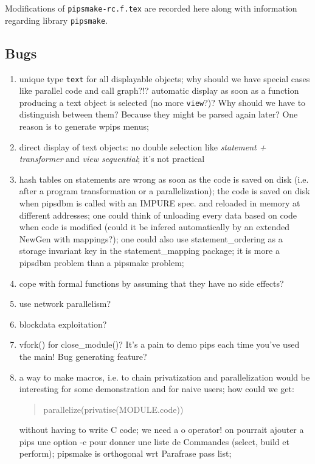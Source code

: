 Modifications of \verb+pipsmake-rc.f.tex+ are recorded here along with
information regarding library \verb+pipsmake+.

\subsection{Bugs}

\begin{enumerate}

  \item unique type {\tt text} for all displayable objects; why should
        we have special cases like parallel code and call graph?!?
        automatic display as soon as a function producing a text object
        is selected (no more {\tt view}?)? Why should we have to distinguish
        between them? Because they might be parsed again later? One
        reason is to generate wpips menus;

  \item direct display of text objects: no double selection like
        {\em statement + transformer} and {\em view sequential}; it's
        not practical

  \item hash tables on statements are wrong as soon as the code is saved
        on disk (i.e. after a program transformation or a
        parallelization); the code is saved on disk when pipsdbm is called
        with an IMPURE spec. and reloaded in memory at different addresses;
        one could think of unloading every data based on code when code
        is modified (could it be infered automatically by an extended
        NewGen with mappings?); one could also use statement\_ordering as
        a storage invariant key in the statement\_mapping package;
        it is more a pipsdbm problem than a pipsmake problem;

  \item cope with formal functions by assuming that they have no side
        effects?

  \item use network parallelism?

  \item blockdata exploitation?

  \item vfork() for close\_module()? It's a pain to demo pips each time
        you've used the main! Bug generating feature?

  \item a way to make macros, i.e. to chain privatization and
        parallelization would be interesting for some demonstration and
        for naive users; how could we get:
        \begin{quote}
                parallelize(privatise(MODULE.code))
        \end{quote}
        without having to write C code; we need a o operator! on
        pourrait ajouter a pips une option -c pour donner une liste de
        Commandes (select, build et perform); 
        pipsmake is orthogonal wrt Parafrase pass list; 


\end{enumerate}
